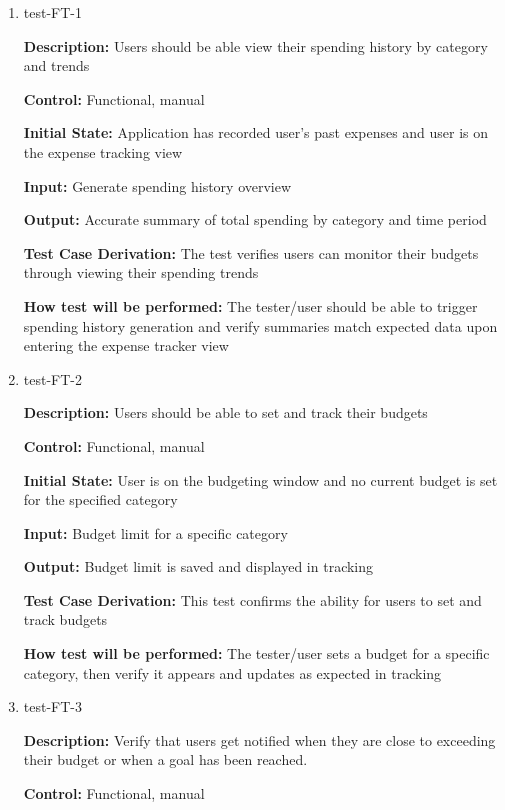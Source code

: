 \documentclass[12pt, titlepage]{article}
\begin{document}
\begin{enumerate}

\item{test-FT-1\\}

\textbf{Description:} Users should be able view their spending history by category and trends

\textbf{Control:} Functional, manual

\textbf{Initial State:} Application has recorded user's past expenses and user is on the expense tracking view

\textbf{Input:} Generate spending history overview

\textbf{Output:} Accurate summary of total spending by category and time period

\textbf{Test Case Derivation:} The test verifies users can monitor their budgets through viewing their spending trends

\textbf{How test will be performed:} The tester/user should be able to trigger spending history generation and verify summaries match expected data upon entering the expense tracker view

\item{test-FT-2\\}

\textbf{Description:} Users should be able to set and track their budgets

\textbf{Control:} Functional, manual

\textbf{Initial State:} User is on the budgeting window and no current budget is set for the specified category

\textbf{Input:} Budget limit for a specific category

\textbf{Output:} Budget limit is saved and displayed in tracking

\textbf{Test Case Derivation:} This test confirms the ability for users to set and track budgets

\textbf{How test will be performed:} The tester/user sets a budget for a specific category, then verify it appears and updates as expected in tracking

\item{test-FT-3\\}

\textbf{Description:} Verify that users get notified when they are close to
exceeding their budget or when a goal has been reached.

\textbf{Control:} Functional, manual


\end{enumerate}
\end{document}
